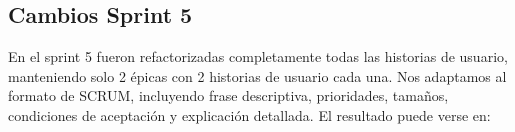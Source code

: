 \documentclass[../../FINAL/Scrum/SCRUM.tex]{subfiles}
\begin{document}
\subsection{Cambios Sprint 5}
En el sprint 5 fueron refactorizadas completamente todas las historias
de usuario, manteniendo solo 2 épicas con 2 historias de usuario cada
una. Nos adaptamos al formato de SCRUM, incluyendo frase descriptiva,
prioridades, tamaños, condiciones de aceptación y explicación detallada.
El resultado puede verse en:
\end{document}
